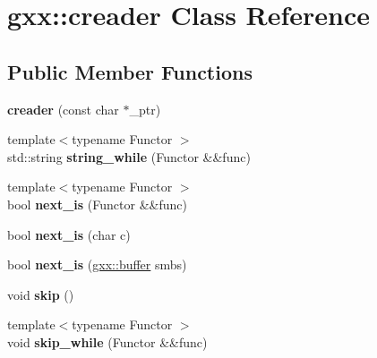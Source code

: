 \hypertarget{classgxx_1_1creader}{}\section{gxx\+:\+:creader Class Reference}
\label{classgxx_1_1creader}
\subsection*{Public Member Functions}
\begin{DoxyCompactItemize}
\item 
{\bfseries creader} (const char $\ast$\+\_\+ptr)\hypertarget{classgxx_1_1creader_a3d64f1c6c8ff097b418d7e4c6da53d0f}{}\label{classgxx_1_1creader_a3d64f1c6c8ff097b418d7e4c6da53d0f}

\item 
{\footnotesize template$<$typename Functor $>$ }\\std\+::string {\bfseries string\+\_\+while} (Functor \&\&func)\hypertarget{classgxx_1_1creader_a1261c0ee4f6f3854bd66f0b340527257}{}\label{classgxx_1_1creader_a1261c0ee4f6f3854bd66f0b340527257}

\item 
{\footnotesize template$<$typename Functor $>$ }\\bool {\bfseries next\+\_\+is} (Functor \&\&func)\hypertarget{classgxx_1_1creader_af64d9c78ecc868146940e5a9566ab531}{}\label{classgxx_1_1creader_af64d9c78ecc868146940e5a9566ab531}

\item 
bool {\bfseries next\+\_\+is} (char c)\hypertarget{classgxx_1_1creader_a375bdf305321c4c0156d0ebbc0fa8174}{}\label{classgxx_1_1creader_a375bdf305321c4c0156d0ebbc0fa8174}

\item 
bool {\bfseries next\+\_\+is} (\hyperlink{classgxx_1_1buffer}{gxx\+::buffer} smbs)\hypertarget{classgxx_1_1creader_a52b3516974e08f14dedb2cdd83cd686f}{}\label{classgxx_1_1creader_a52b3516974e08f14dedb2cdd83cd686f}

\item 
void {\bfseries skip} ()\hypertarget{classgxx_1_1creader_a3b1908b476a8ae52a484d6c3313e4043}{}\label{classgxx_1_1creader_a3b1908b476a8ae52a484d6c3313e4043}

\item 
{\footnotesize template$<$typename Functor $>$ }\\void {\bfseries skip\+\_\+while} (Functor \&\&func)\hypertarget{classgxx_1_1creader_a9438293285f7a90bfbd173a77d5b8eb4}{}\label{classgxx_1_1creader_a9438293285f7a90bfbd173a77d5b8eb4}


\end{DoxyCompactItemize}
